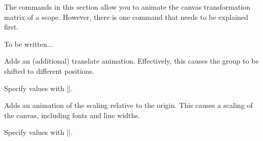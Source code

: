 The commands in this section allow you to animate the canvas
transformation matrix of a scope. However, there is one command that
needs to be explained first.

\begin{command}{\pgfsys@animation@canvas@transform{}}
  To be written...

\begin{codeexample}[]
\pgfsys@animation@canvas@transform%
  {{\pgflowlevelsynccm}}{\pgftransforminvert\pgflowlevelsynccm}    
\end{codeexample}
\end{command}


\begin{command}{\pgfsys@animatetranslate}
  Adds an (additional) translate animation. Effectively, this causes
  the group to be shifted to different positions.
  
  Specify values with |\pgfsys@animation@translate|. 
\begin{codeexample}[width=2cm]
\end{codeexample}
\end{command}

\begin{command}{\pgfsys@animatescale}
  Adds an animation of the scaling relative to the origin. This causes
  a scaling of the canvas, including fonts and line widths.
  
  Specify values with |\pgfsys@animation@scale|.
\begin{codeexample}[width=2cm]
\end{codeexample}
\end{command}

